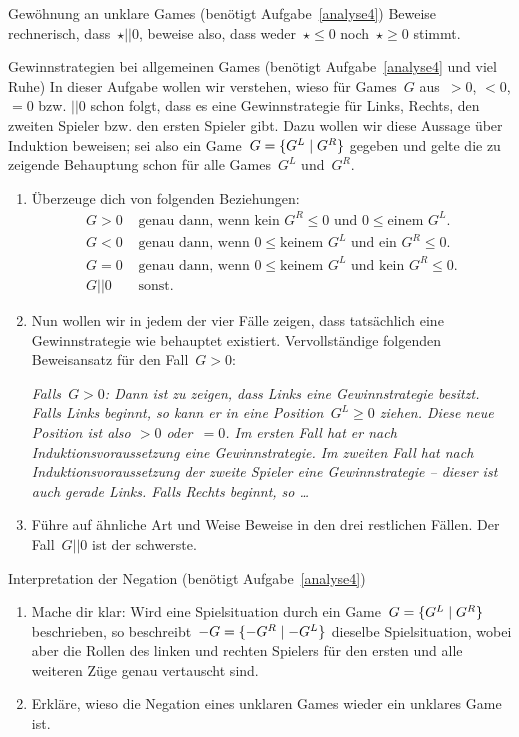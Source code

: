 \documentclass{../zirkelblatt}
\newcommand{\fuzzy}{\mathrel{||}}
\begin{document}
\begin{aufgabe}{Gewöhnung an unklare Games (benötigt Aufgabe~\ref{analyse4})}
Beweise rechnerisch, dass~$\star \fuzzy 0$, beweise also, dass weder~$\star
\leq 0$ noch~$\star \geq 0$ stimmt.
\end{aufgabe}

\begin{aufgabe}{Gewinnstrategien bei allgemeinen Games (benötigt
Aufgabe~\ref{analyse4} und viel Ruhe)}
\label{gewinnstrategien}
In dieser Aufgabe wollen wir verstehen, wieso für Games~$G$ aus~$> 0$, $<
0$, $= 0$ bzw. $\fuzzy 0$ schon folgt, dass es eine Gewinnstrategie für Links,
Rechts, den zweiten Spieler bzw. den ersten Spieler gibt. Dazu wollen wir diese
Aussage über Induktion beweisen; sei also ein Game~$G = \{ G^L \mathrel{|} G^R \}$
gegeben und gelte die zu zeigende Behauptung schon für alle Games~$G^L$
und~$G^R$.
\begin{enumerate}
\item Überzeuge dich von folgenden Beziehungen:
\begin{align*}
  G > 0 &\text{ genau dann, wenn $\text{kein $G^R$} \leq 0$ und~$0 \leq \text{einem $G^L$}$.} \\
  G < 0 &\text{ genau dann, wenn $0 \leq \text{keinem $G^L$}$ und~$\text{ein $G^R$} \leq 0$.} \\
  G = 0 &\text{ genau dann, wenn $0 \leq \text{keinem $G^L$}$ und~$\text{kein $G^R$} \leq 0$.} \\
  G \fuzzy 0 &\text{ sonst.}
\end{align*}
\item Nun wollen wir in jedem der vier Fälle zeigen, dass tatsächlich eine Gewinnstrategie
wie behauptet existiert. Vervollständige folgenden Beweisansatz für den Fall~$G
> 0$:

\emph{Falls~$G > 0$: Dann ist zu zeigen, dass Links eine
Gewinnstrategie besitzt. Falls Links beginnt, so kann er in eine Position~$G^L
\geq 0$ ziehen. Diese neue Position ist also $> 0$ oder~$= 0$. Im ersten Fall
hat er nach Induktionsvoraussetzung eine Gewinnstrategie. Im zweiten Fall hat
nach Induktionsvoraussetzung der zweite Spieler eine Gewinnstrategie -- dieser
ist auch gerade Links. Falls Rechts beginnt, so \ldots}
\item Führe auf ähnliche Art und Weise Beweise in den drei restlichen Fällen.
Der Fall~$G \fuzzy 0$ ist der schwerste.
\end{enumerate}
\end{aufgabe}

\begin{aufgabe}{Interpretation der Negation (benötigt Aufgabe~\ref{analyse4})}
\label{game-negation}
\begin{enumerate}
\item Mache dir klar: Wird eine Spielsituation durch ein Game~$G =
\{ G^L \mathrel{|} G^R \}$ beschrieben,
so beschreibt~$-G = \{ -G^R \mathrel{|} -G^L \}$ dieselbe Spielsituation, wobei aber die Rollen des linken und
rechten Spielers für den ersten und alle weiteren Züge genau vertauscht sind.
\item Erkläre, wieso die Negation
eines unklaren Games wieder ein unklares Game ist.
\end{enumerate}
\end{aufgabe}
\end{document}
